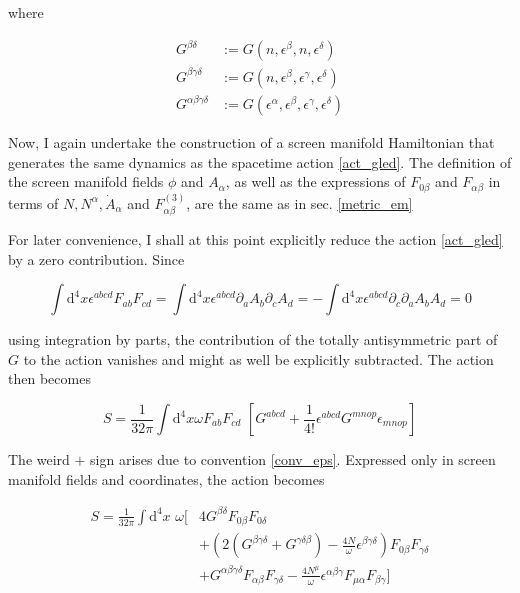 \documentclass[11pt]{article}
\begin{document}
where

\begin{align}
	G^{\beta \delta} 
	&:= G \left( n, \epsilon^\beta, n, \epsilon^\delta \right)\\
	G^{\beta \gamma \delta} 
	&:= G \left( n, \epsilon^\beta, \epsilon^\gamma, \epsilon^\delta \right)\\
	G^{\alpha \beta \gamma \delta} 
	&:= G \left( \epsilon^\alpha, \epsilon^\beta, \epsilon^\gamma, \epsilon^\delta \right)
\end{align}

Now, I again undertake the construction of a screen manifold Hamiltonian that generates the same dynamics as the spacetime action \ref{act_gled}. The definition of the screen manifold fields $\phi$ and $A_\alpha$, as well as the expressions of $F_{ 0 \beta}$ and $F_{\alpha \beta}$ in terms of $N, N^\alpha, \dot{A}_\alpha$ and $F^{(3)}_{\alpha \beta}$, are the same as in sec. \ref{metric_em}

For later convenience, I shall at this point explicitly reduce the action \ref{act_gled} by a zero contribution. Since

\begin{equation}
	\int \mathrm{d}^4 x \epsilon^{a b c d} F_{a b} F_{c d} 
	= \int \mathrm{d}^4 x \epsilon^{a b c d} \partial_a A_b \partial_c A_d
	= - \int \mathrm{d}^4 x \epsilon^{a b c d} \partial_c \partial_a A_b A_d
	= 0
\end{equation}

using integration by parts, the contribution of the totally antisymmetric part of $G$ to the action vanishes and might as well be explicitly subtracted. The action then becomes

\begin{equation} 
	S = \frac{1}{32 \pi} \int \mathrm{d}^4 x \omega F_{a b} F_{c d} \, \,
	\left[ G^{a b c d} + \frac{1}{4!} \epsilon^{a b c d} G^{m n o p} \epsilon_{m n o p}
	\right]
\end{equation}

The weird $+$ sign arises due to convention \ref{conv_eps}. Expressed only in screen manifold fields and coordinates, the action becomes

\begin{equation} 
\begin{split}
	S = \frac{1}{32 \pi} \int \mathrm{d}^4 x \,\,\omega 
	[ 
	&4 G^{\beta \delta} F_{0 \beta} F_{0 \delta} \\
	&+ \left( 
	2 \left( G^{\beta \gamma \delta} + G^{ \gamma \delta \beta} \right)
	- \frac{4 N}{\omega} \epsilon^{\beta \gamma \delta}
	\right) F_{0 \beta} F_{\gamma \delta}\\
	&+ G^{\alpha \beta \gamma \delta} F_{\alpha \beta} F_{\gamma \delta}
	-  \frac{4 N^\mu}{\omega} 
	\epsilon^{\alpha \beta \gamma} F_{\mu \alpha} F_{\beta \gamma}
	]
\end{split}
\end{equation}
\end{document}
